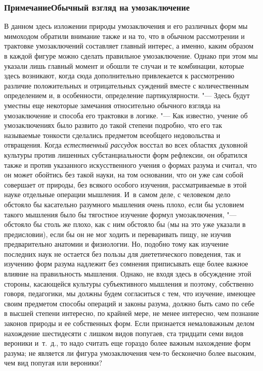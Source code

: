 {{\subsubsection[Примечание Обычный взгляд на умозаключение]
{Примечание\newline Обычный взгляд на умозаключение}

В данном здесь изложении природы умозаключения и его различных
форм мы мимоходом обратили внимание также и на то, что в обычном
рассмотрении и трактовке умозаключений составляет главный
интерес, а именно, каким образом в каждой фигуре можно сделать правильное
умозаключение. Однако при этом мы указали лишь главный момент и обошли те
случаи и те комбинации, которые здесь возникают, когда сюда дополнительно
привлекается к рассмотрению различие положительных и отрицательных суждений
вместе с количественным определением и, в особенности, определение
партикулярности. "--- Здесь будут уместны еще некоторые
замечания относительно обычного взгляда на умозаключение и способа его
трактовки в логике. "--- Как известно, учение об умозаключениях
было развито до такой степени подробно, что его так называемые тонкости
сделались предметом всеобщего недовольства и отвращения. Когда
{\em естественный рассудок}
восстал во всех областях духовной культуры против лишенных
субстанциальности форм рефлексии, он обратился также и против указанного
искусственного учения о формах разума и считал, что он может обойтись без
такой науки, на том основании, что он уже сам собой совершает от природы,
без всякого особого изучения, рассматриваемые в этой науке отдельные
операции мышления. И~в самом деле, с человеком дело обстояло бы касательно
разумного мышления очень плохо, если бы условием такого мышления было бы
тягостное изучение формул умозаключения, "--- обстояло бы столь
же плохо, как с ним обстояло бы (мы на это уже указали в
предисловии),
если бы он не мог ходить и переваривать пищу, не изучив
предварительно анатомии и физиологии. Но, подобно тому как изучение
последних наук не остается без пользы для диететического поведения, так и
изучению форм разума надлежит без сомнения приписывать еще более важное
влияние на правильность мышления. Однако, не входя здесь в обсуждение этой
стороны, касающейся культуры субъективного мышления и поэтому, собственно
говоря, педагогики, мы должны будем согласиться с тем, что изучение,
имеющее своим предметом способы операций и законы разума, должно быть само
по себе в высшей степени интересно, по крайней мере, не менее интересно,
чем познание законов природы и ее собственных форм. Если признается
немаловажным делом нахождение шестидесяти с лишком видов попугаев, ста
тридцати семи видов вероники и~т.~д., то надо считать еще гораздо более
важным нахождение форм разума; не является ли фигура умозаключения чем-то
бесконечно более высоким, чем вид попугая или вероники?

}}
